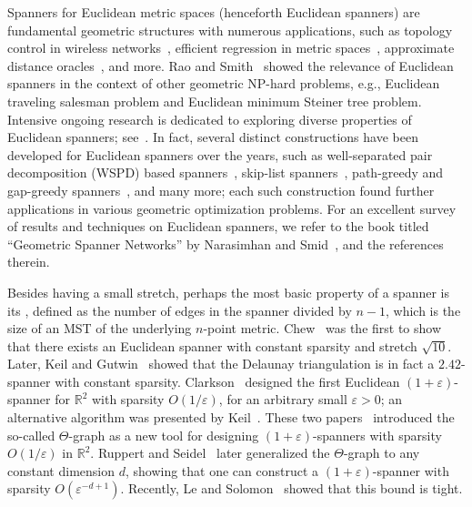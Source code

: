 \documentclass[11pt,english]{article}
\renewcommand{\emph}[1]{{\color{MyGreen}{\em #1}}}
\newcommand{\eps}{\varepsilon}
\begin{document}
Spanners for Euclidean metric spaces (henceforth Euclidean spanners) are fundamental geometric structures with numerous applications, such as topology control in wireless networks~\cite{schindelhauer2007geometric}, efficient regression in metric spaces~\cite{gottlieb2017efficient},
approximate distance oracles~\cite{gudmundsson2008approximate}, and more.
Rao and Smith~\cite{rao1998approximating} showed the relevance of Euclidean spanners in the context of other geometric \textsf{NP}-hard problems, e.g., Euclidean traveling salesman problem and Euclidean minimum Steiner tree problem.
Intensive ongoing research is dedicated to exploring diverse properties of Euclidean spanners; see~\cite{althofer1993sparse, arya1995euclidean, BhoreKK0LPT25, BhoreT21a, BhoreT21b, BhoreT22, BCHZST25, chan2009small, das1995new, gudmundsson2002fast, keil1992classes, ES15, rao1998approximating, le2019truly}. In fact, several distinct constructions have been developed for Euclidean spanners over the years, such as
well-separated pair decomposition (WSPD) based spanners~\cite{callahan1993optimal, gudmundsson2002fast}, skip-list spanners~\cite{arya1994randomized},
path-greedy and gap-greedy spanners~\cite{althofer1993sparse, arya1997efficient}, and many more; each such construction found further applications in various geometric optimization problems. For an excellent survey of results and techniques on Euclidean spanners, we refer to the book titled ``Geometric Spanner Networks'' by Narasimhan and Smid~\cite{narasimhan2007geometric}, and the references therein. 



Besides having a small stretch, perhaps the most basic property of a spanner is its \emph{sparsity}, defined as the number of edges in the spanner divided by $n-1$, which is the size of an MST of the underlying $n$-point metric.
Chew~\cite{Chew86} was the first to show that there exists an Euclidean spanner with constant sparsity and stretch $\sqrt{10}$. Later, Keil and Gutwin~\cite{keil1992classes} showed that the Delaunay triangulation is in fact a $2.42$-spanner with constant sparsity. Clarkson~\cite{Clarkson87} designed the first Euclidean $(1+\eps)$-spanner for $\mathbb{R}^2$ with sparsity $O(1/\eps)$, for an arbitrary small $\eps>0$; an alternative algorithm was presented by Keil~\cite{keil1988approximating}.
These two papers~\cite{Clarkson87, keil1988approximating} introduced the so-called $\Theta$-graph as a new tool for designing $(1+\eps)$-spanners with sparsity $O(1/\eps)$ in $\mathbb{R}^2$. Ruppert and Seidel~\cite{ruppert1991approximating} later generalized the $\Theta$-graph to any constant dimension $d$, showing that one can construct a $(1+\eps)$-spanner with sparsity $O(\eps^{-d+1})$. Recently, Le and Solomon~\cite{le2019truly} showed that this bound is tight. 
\end{document}
